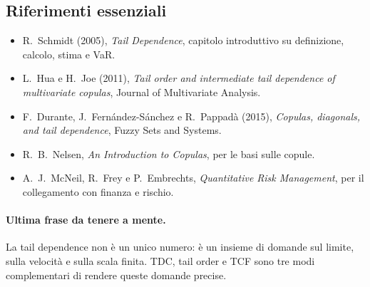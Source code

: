 \documentclass[11pt,a4paper]{article}
\begin{document}
\subsection{Riferimenti essenziali}

\begin{itemize}
  \item R.~Schmidt (2005), \emph{Tail Dependence}, capitolo introduttivo su
  definizione, calcolo, stima e VaR.
  \item L.~Hua e H.~Joe (2011), \emph{Tail order and intermediate tail
  dependence of multivariate copulas}, Journal of Multivariate Analysis.
  \item F.~Durante, J.~Fernández-Sánchez e R.~Pappadà (2015), \emph{Copulas,
  diagonals, and tail dependence}, Fuzzy Sets and Systems.
  \item R.~B.~Nelsen, \emph{An Introduction to Copulas}, per le basi sulle
  copule.
  \item A.~J.~McNeil, R.~Frey e P.~Embrechts, \emph{Quantitative Risk
  Management}, per il collegamento con finanza e rischio.
\end{itemize}

\paragraph{Ultima frase da tenere a mente.}
La tail dependence non è un unico numero: è un insieme di domande sul limite,
sulla velocità e sulla scala finita. TDC, tail order e TCF sono tre modi
complementari di rendere queste domande precise.
\end{document}
